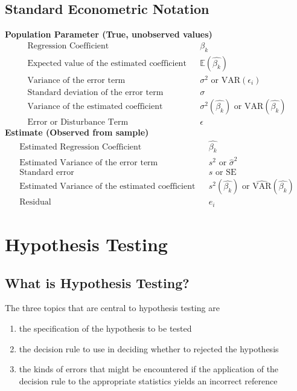 \documentclass[11pt]{article}
\begin{document}
\subsection{Standard Econometric Notation}
\textbf{Population Parameter (True, unobserved values)}
\begin{align*}
\text{Regression Coefficient} & & \beta_k\\
\text{Expected value of the estimated coefficient} & & \mathbb{E}(\hat{\beta_k})\\
\text{Variance of the error term} & & \sigma^2 \text{ or VAR} (\epsilon_i)\\
\text{Standard deviation of the error term} & & \sigma\\
\text{Variance of the estimated coefficient} & & \sigma^2(\hat{\beta_k})\text{ or VAR}(\hat{\beta_k})\\
\text{Error or Disturbance Term} & & \epsilon
\end{align*}
\textbf{Estimate (Observed from sample)}
\begin{align*}
\text{Estimated Regression Coefficient} & & \hat{\beta_k}\\
\text{Estimated Variance of the error term} & & s^2 \text{ or } \hat{\sigma}^2\\
\text{Standard error} & & s \text{ or SE}\\
\text{Estimated Variance of the estimated coefficient} & & s^2(\hat{\beta_k}) \text{ or } \widehat{\text{VAR}}(\hat{\beta_k})\\
\text{Residual} & & e_i
\end{align*}
\clearpage
\section{Hypothesis Testing}
\subsection{What is Hypothesis Testing?}
The three topics that are central to hypothesis testing are
\begin{enumerate}
\item the specification of the hypothesis to be tested
\item the decision rule to use in deciding whether to rejected the hypothesis
\item the kinds of errors that might be encountered if the application of the decision rule to the appropriate statistics yields an incorrect reference
\end{enumerate}
\end{document}
